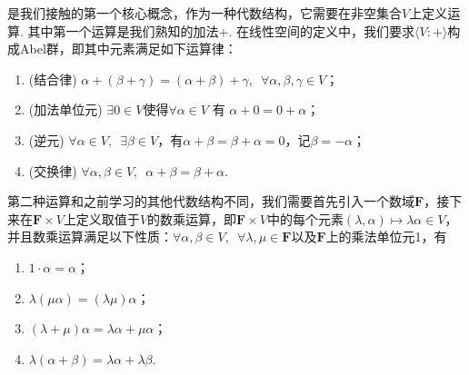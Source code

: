是我们接触的第一个核心概念，作为一种代数结构，它需要在非空集合$V$上定义运算. 其中第一个运算是我们熟知的加法$+$. 在线性空间的定义中，我们要求$\langle V:+\rangle$构成Abel群，即其中元素满足如下运算律：
\begin{enumerate}
    \item (结合律) $\alpha+(\beta+\gamma)=(\alpha+\beta)+\gamma,\enspace\forall \alpha,\beta,\gamma \in V$；

    \item (加法单位元) $\exists 0 \in V$使得$\forall\alpha\in V$ 有 $\alpha+0=0+\alpha$；

    \item (逆元) $\forall\alpha\in V,\enspace \exists \beta \in V$，有$\alpha+\beta=\beta+\alpha=0$，记$\beta=-\alpha$；

    \item (交换律) $\forall\alpha, \beta\in V,\enspace \alpha+\beta=\beta+\alpha$.
\end{enumerate}

第二种运算和之前学习的其他代数结构不同，我们需要首先引入一个数域$\mathbf{F}$，接下来在$\mathbf{F}\times V$上定义取值于$V$的数乘运算，即$\mathbf{F}\times V$中的每个元素$(\lambda,\alpha)\mapsto \lambda\alpha\in V$，并且数乘运算满足以下性质：$\forall \alpha,\beta \in V,\enspace\forall \lambda,\mu\in\mathbf{F}$以及$\mathbf{F}$上的乘法单位元1，有
\begin{enumerate}
    \item $1\cdot \alpha=\alpha$；

    \item $\lambda(\mu\alpha)=(\lambda\mu)\alpha$；

    \item $(\lambda+\mu)\alpha=\lambda\alpha+\mu\alpha$；

    \item $\lambda(\alpha+\beta)=\lambda\alpha+\lambda\beta$.
\end{enumerate}


